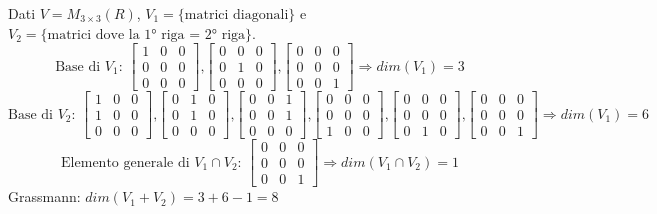 \begin{example}
	Dati $V = M_{3 \times 3}(R)$, $V_1 = \{\text{matrici diagonali}\}$ e $V_2 = \{\text{matrici dove la 1° riga = 2° riga}\}$.
	\[
	\text{Base di $V_1$: }
	\begin{bmatrix}
		1 & 0 & 0 \\
		0 & 0 & 0 \\
		0 & 0 & 0 
	\end{bmatrix}
	\text{,}
	\begin{bmatrix}
		0 & 0 & 0 \\
		0 & 1 & 0 \\
		0 & 0 & 0 
	\end{bmatrix}
	\text{,}
	\begin{bmatrix}
		0 & 0 & 0 \\
		0 & 0 & 0 \\
		0 & 0 & 1
	\end{bmatrix}
	\Rightarrow dim(V_1) = 3
	\]
	\[
	\text{Base di $V_2$: }
	\begin{bmatrix}
		1 & 0 & 0 \\
		1 & 0 & 0 \\
		0 & 0 & 0 
	\end{bmatrix}
	\text{,}
	\begin{bmatrix}
		0 & 1 & 0 \\
		0 & 1 & 0 \\
		0 & 0 & 0 
	\end{bmatrix}
	\text{,}
	\begin{bmatrix}
		0 & 0 & 1 \\
		0 & 0 & 1 \\
		0 & 0 & 0
	\end{bmatrix}
	\text{,}
	\begin{bmatrix}
		0 & 0 & 0 \\
		0 & 0 & 0 \\
		1 & 0 & 0
	\end{bmatrix}
	\text{,}
	\begin{bmatrix}
		0 & 0 & 0 \\
		0 & 0 & 0 \\
		0& 1 & 0
	\end{bmatrix}
	\text{,}
	\begin{bmatrix}
		0 & 0 & 0 \\
		0 & 0 & 0 \\
		0 & 0 & 1
	\end{bmatrix}
	\Rightarrow dim(V_1) = 6
	\]
	\[
	\text{Elemento generale di $V_1 \cap V_2$: }
	\begin{bmatrix}
		0 & 0 & 0 \\
		0 & 0 & 0 \\
		0 & 0 & 1
	\end{bmatrix}
	\Rightarrow dim(V_1 \cap V_2) = 1
	\]
	Grassmann: $dim(V_1 + V_2) = 3 + 6 - 1 = 8$
\end{example}